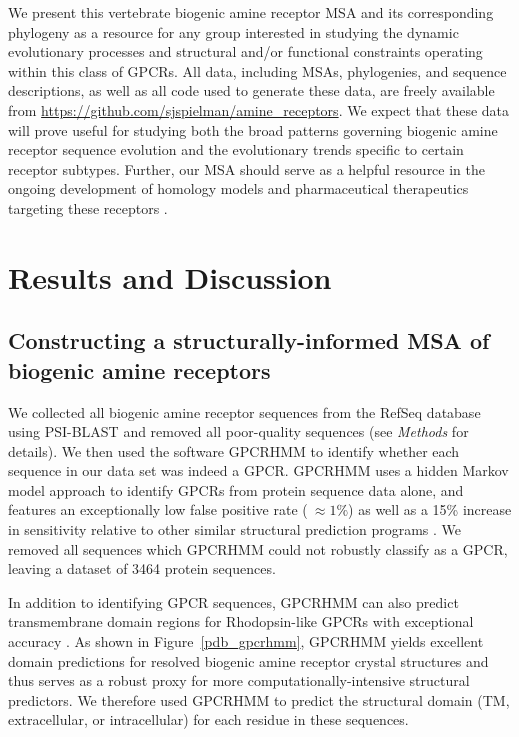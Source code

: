 \documentclass[fleqn,10pt]{wlpeerj}
\begin{document}
We present this vertebrate biogenic amine receptor MSA and its corresponding phylogeny as a resource for any group interested in studying the dynamic evolutionary processes and structural and/or functional constraints operating within this class of GPCRs. All data, including MSAs, phylogenies, and sequence descriptions, as well as all code used to generate these data, are freely available from \url{https://github.com/sjspielman/amine\_receptors}. We expect that these data will prove useful for studying both the broad patterns governing biogenic amine receptor sequence evolution and the evolutionary trends specific to certain receptor subtypes. Further, our MSA should serve as a helpful resource in the ongoing development of homology models and pharmaceutical therapeutics targeting these receptors \citep{Kristiansen2004,Ishiguro2004,Eversetal2005,Masonetal2012}.




\section*{Results and Discussion}

\subsection*{Constructing a structurally-informed MSA of biogenic amine receptors}

We collected all biogenic amine receptor sequences from the RefSeq database \citep{refseq} using PSI-BLAST and removed all poor-quality sequences (see \emph{Methods} for details). We then used the software GPCRHMM \citep{Wistrand2006} to identify whether each sequence in our data set was indeed a GPCR. GPCRHMM uses a hidden Markov model approach to identify GPCRs from protein sequence data alone, and features an exceptionally low false positive rate ($~\approx 1\%$) as well as a 15\% increase in sensitivity relative to other similar structural prediction programs \citep{Wistrand2006}. We removed all sequences which GPCRHMM could not robustly classify as a GPCR, leaving a dataset of 3464 protein sequences. 

In addition to identifying GPCR sequences, GPCRHMM can also predict transmembrane domain regions for Rhodopsin-like GPCRs with exceptional accuracy \citep{SpielmanWilke2013}. As shown in Figure~\ref{pdb_gpcrhmm}, GPCRHMM yields excellent domain predictions for resolved biogenic amine receptor crystal structures and thus serves as a robust proxy for more computationally-intensive structural predictors. We therefore used GPCRHMM to predict the structural domain (TM, extracellular, or intracellular) for each residue in these sequences.
\end{document}
